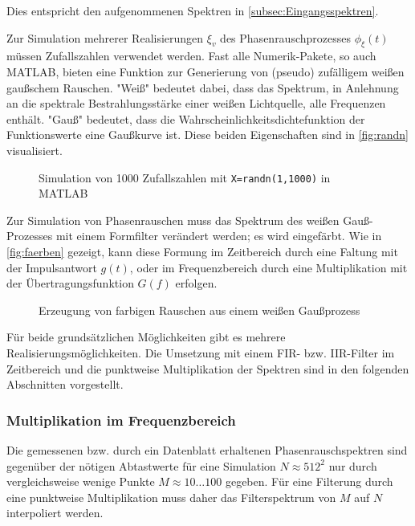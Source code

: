 Dies entspricht den aufgenommenen Spektren in \autoref{subsec:Eingangsspektren}.

Zur Simulation mehrerer Realisierungen $\xi_v$ des Phasenrauschprozesses $\phi_\xi(t)$ müssen Zufallszahlen verwendet werden. Fast alle Numerik-Pakete, so auch MATLAB, bieten eine Funktion zur Generierung von (pseudo) zufälligem weißen gaußschem Rauschen. "Weiß" bedeutet dabei, dass das Spektrum, in Anlehnung an die spektrale Bestrahlungsstärke einer weißen Lichtquelle, alle Frequenzen enthält. "Gauß" bedeutet, dass die Wahrscheinlichkeitsdichtefunktion der Funktionswerte eine Gaußkurve ist. Diese beiden Eigenschaften sind in \autoref{fig:randn} visualisiert.

\begin{figure}[H]
	\centering
	\hfill
	\caption[Gauß-verteilte Zufallszahlen]{Simulation von 1000 Zufallszahlen mit \texttt{X=randn(1,1000)} in MATLAB}
	\label{fig:randn}
\end{figure}

Zur Simulation von Phasenrauschen muss das Spektrum des weißen Gauß-Prozesses mit einem Formfilter verändert werden; es wird eingefärbt. Wie in \autoref{fig:faerben} gezeigt, kann diese Formung im Zeitbereich durch eine Faltung mit der Impulsantwort $g(t)$, oder im Frequenzbereich durch eine Multiplikation mit der Übertragungsfunktion $G(f)$ erfolgen.

\begin{figure}[H]
	\centering
	\caption[Erzeugen von farbigem Rauschen]{Erzeugung von farbigen Rauschen aus einem weißen Gaußprozess}
	\label{fig:faerben}
\end{figure}

Für beide grundsätzlichen Möglichkeiten gibt es mehrere Realisierungsmöglichkeiten. Die Umsetzung mit einem FIR- bzw. IIR-Filter im Zeitbereich und die punktweise Multiplikation der Spektren sind in den folgenden Abschnitten vorgestellt.

\subsubsection{Multiplikation im Frequenzbereich}
Die gemessenen bzw. durch ein Datenblatt erhaltenen Phasenrauschspektren sind gegenüber der nötigen Abtastwerte für eine Simulation $N\approx512^2$ nur durch vergleichsweise wenige Punkte $M\approx10 \dots 100$ gegeben. Für eine Filterung durch eine punktweise Multiplikation muss daher das Filterspektrum von $M$ auf $N$ interpoliert werden.

